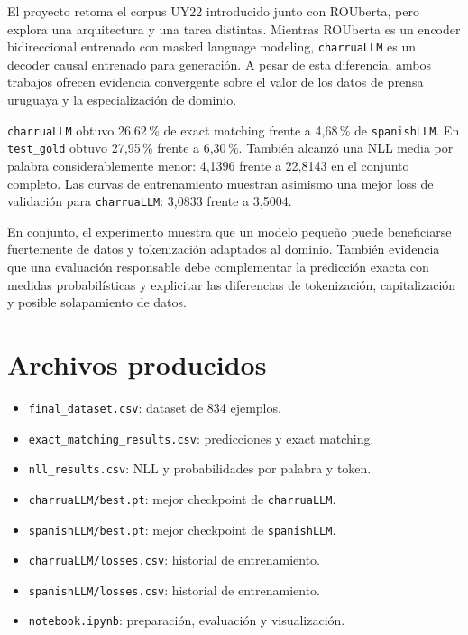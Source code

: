 \documentclass[11pt,a4paper]{article}
\newcommand{\charrua}{\texttt{charruaLLM}}
\newcommand{\spanishmodel}{\texttt{spanishLLM}}
\newcommand{\code}[1]{\texttt{#1}}
\begin{document}
El proyecto retoma el corpus UY22 introducido junto con ROUberta, pero explora
una arquitectura y una tarea distintas. Mientras ROUberta es un encoder
bidireccional entrenado con masked language modeling, \charrua{} es un decoder
causal entrenado para generación. A pesar de esta diferencia, ambos trabajos
ofrecen evidencia convergente sobre el valor de los datos de prensa uruguaya y
la especialización de dominio.

\charrua{} obtuvo 26,62\,\% de exact matching frente a 4,68\,\% de
\spanishmodel. En \code{test\_gold} obtuvo 27,95\,\% frente a 6,30\,\%.
También alcanzó una NLL media por palabra considerablemente menor: 4,1396
frente a 22,8143 en el conjunto completo. Las curvas de entrenamiento muestran
asimismo una mejor loss de validación para \charrua: 3,0833 frente a 3,5004.

En conjunto, el experimento muestra que un modelo pequeño puede beneficiarse
fuertemente de datos y tokenización adaptados al dominio. También evidencia que
una evaluación responsable debe complementar la predicción exacta con medidas
probabilísticas y explicitar las diferencias de tokenización, capitalización y
posible solapamiento de datos.


\section{Archivos producidos}

\begin{itemize}
    \item \code{final\_dataset.csv}: dataset de 834 ejemplos.
    \item \code{exact\_matching\_results.csv}: predicciones y exact matching.
    \item \code{nll\_results.csv}: NLL y probabilidades por palabra y token.
    \item \code{charruaLLM/best.pt}: mejor checkpoint de \charrua.
    \item \code{spanishLLM/best.pt}: mejor checkpoint de \spanishmodel.
    \item \code{charruaLLM/losses.csv}: historial de entrenamiento.
    \item \code{spanishLLM/losses.csv}: historial de entrenamiento.
    \item \code{notebook.ipynb}: preparación, evaluación y visualización.
\end{itemize}
\end{document}
